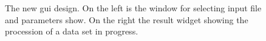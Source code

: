 \begin{figure}
\hfill
{}
	\caption{The new gui design. On the left is the window for selecting input file and parameters show. On the right the result widget showing the procession of a data set in progress.}
	\label{guiWidgets}	
\end{figure}